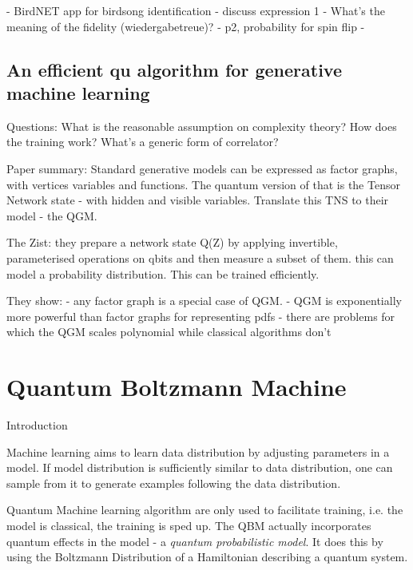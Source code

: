 - BirdNET app for birdsong identification
- discuss expression 1
- What's the meaning of the fidelity (wiedergabetreue)?  
- p2, probability for spin flip - 


\subsection{An efficient qu algorithm for generative machine learning}

Questions:
What is the reasonable assumption on complexity theory?
How does the training work?
What's a generic form of correlator?

Paper summary: Standard generative models can be expressed as factor graphs,
with vertices variables and functions. The quantum version of that is the Tensor
Network state - with hidden and visible variables. 
Translate this TNS to their model - the QGM.

The Zist: they prepare a network state Q(Z) by applying invertible,
parameterised operations on qbits and then measure a subset of them. this can
model a probability distribution. This can be trained efficiently.

They show:
- any factor graph is a special case of QGM. 
- QGM is exponentially more powerful than factor graphs for representing pdfs
- there are problems for which the QGM scales polynomial while classical
algorithms don't

\section{Quantum Boltzmann Machine}
\newcommand{\be}{\begin{equation}}
\newcommand{\ee}{\end{equation}}
\newcommand{\ba}{\begin{eqnarray}}
\newcommand{\ea}{\end{eqnarray}}
\renewcommand{\bf}{\mathbf}

\newcommand{\nn}{\nonumber \\}
\def\p{\partial}
\def\tr{\text{Tr}}
Introduction

Machine learning aims to learn data distribution by adjusting parameters in a
model. If model distribution is sufficiently similar to data distribution, one
can sample from it to generate examples following the data distribution.

Quantum Machine learning algorithm are only used to facilitate training, i.e.
the model is classical, the training is sped up. The QBM
actually incorporates quantum effects in the model - a \emph{quantum
probabilistic model}. It does this by using the Boltzmann Distribution of a Hamiltonian describing a quantum
system.
